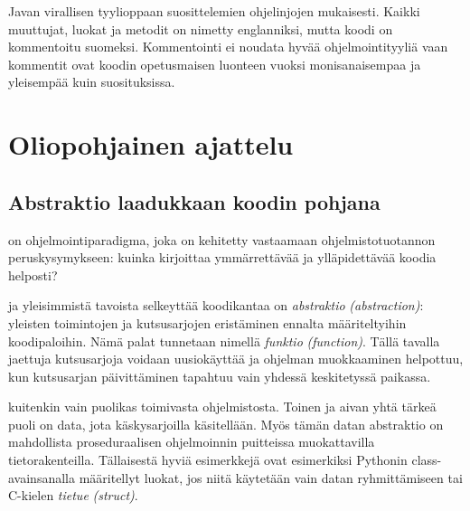 \documentclass{tufte-book}
\newcommand{\eng}[1]{\textit{(#1)}}
\newcommand{\new}[1]{\textit{\gls{#1}}}
\newcommand{\neweng}[2]{\new{#1} \eng{#2}}
\begin{document}
 Javan virallisen tyylioppaan suosittelemien
ohjelinjojen mukaisesti. Kaikki muuttujat, luokat ja metodit on nimetty englanniksi, mutta koodi
on kommentoitu suomeksi. Kommentointi ei noudata hyvää ohjelmointityyliä vaan kommentit ovat
koodin opetusmaisen luonteen vuoksi monisanaisempaa ja yleisempää kuin suosituksissa.


\chapter{Oliopohjainen ajattelu}
\label{olioista}


\section{Abstraktio laadukkaan koodin pohjana}
\label{abstraktiosta}

 on ohjelmointiparadigma, joka on kehitetty vastaamaan
ohjelmistotuotannon peruskysymykseen: kuinka kirjoittaa ymmärrettävää ja ylläpidettävää koodia
helposti?

 ja yleisimmistä tavoista selkeyttää koodikantaa on
\neweng{abstraktio}{abstraction}: yleisten toimintojen ja kutsusarjojen eristäminen ennalta
määriteltyihin koodipaloihin. Nämä palat tunnetaan nimellä \neweng{funktio}{function}. Tällä
tavalla jaettuja kutsusarjoja voidaan uusiokäyttää ja ohjelman muokkaaminen helpottuu, kun
kutsusarjan päivittäminen tapahtuu vain yhdessä keskitetyssä paikassa.

 kuitenkin vain puolikas toimivasta ohjelmistosta. Toinen ja aivan
yhtä tärkeä puoli on data, jota käskysarjoilla käsitellään. Myös tämän datan abstraktio on
mahdollista proseduraalisen ohjelmoinnin puitteissa muokattavilla tietorakenteilla. Tällaisestä
hyviä esimerkkejä ovat esimerkiksi Pythonin class-avainsanalla määritellyt luokat, jos niitä
käytetään vain datan ryhmittämiseen tai C-kielen \neweng{tietue}{struct}.
\end{document}
